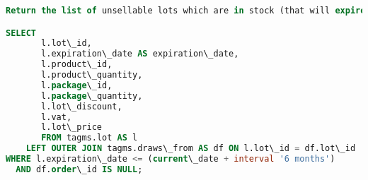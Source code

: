 \begin{lstlisting}[language=SQL,
keywordstyle=\color{blue},
stringstyle=\color{mauve},
showstringspaces=false,
basicstyle=\ttfamily\footnotesize]
Return the list of unsellable lots which are in stock (that will expire in less than 6 months).

SELECT
       l.lot\_id,
       l.expiration\_date AS expiration\_date,
       l.product\_id,
       l.product\_quantity,
       l.package\_id,
       l.package\_quantity,
       l.lot\_discount,
       l.vat,
       l.lot\_price
       FROM tagms.lot AS l
    LEFT OUTER JOIN tagms.draws\_from AS df ON l.lot\_id = df.lot\_id
WHERE l.expiration\_date <= (current\_date + interval '6 months')
  AND df.order\_id IS NULL;

\end{lstlisting}

